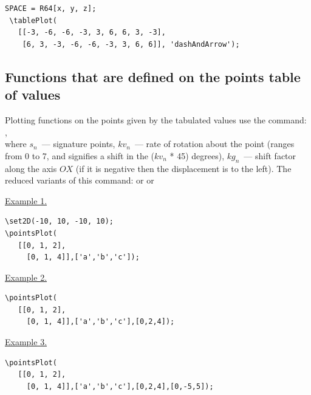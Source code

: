  \vspace*{-2mm}

 \begin{verbatim}
SPACE = R64[x, y, z];
 \tablePlot(
   [[-3, -6, -6, -3, 3, 6, 6, 3, -3],
    [6, 3, -3, -6, -6, -3, 3, 6, 6]], 'dashAndArrow');
 \end{verbatim}

\subsection{Functions that are defined on the points table of values}
Plotting functions on the points given by the tabulated values use the command: 
,\\
where $s_{n}$~--- signature points, $kv_{n}$~--- rate of rotation about the point (ranges from 0 to 7, and signifies a shift in the ($kv_{n}$ * 45) degrees), 
$kg_{n}$~--- shift factor along the axis $OX$ (if it is negative then the displacement is to the left).
The reduced variants of this command:
or
or
 
\underline{Example 1.}
 
 \vspace*{-2mm}

\begin{verbatim}
\set2D(-10, 10, -10, 10);
\pointsPlot(
   [[0, 1, 2],
     [0, 1, 4]],['a','b','c']);
\end{verbatim}

\underline{Example 2.}
 
 \vspace*{-2mm}

\begin{verbatim}
\pointsPlot(
   [[0, 1, 2],
     [0, 1, 4]],['a','b','c'],[0,2,4]);
\end{verbatim}

\underline{Example 3.}
 
 \vspace*{-2mm}

\begin{verbatim}
\pointsPlot(
   [[0, 1, 2],
     [0, 1, 4]],['a','b','c'],[0,2,4],[0,-5,5]);
\end{verbatim}

